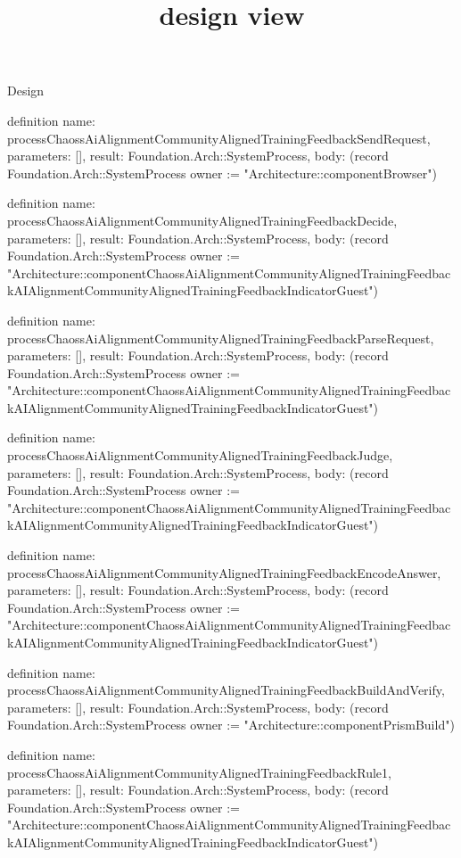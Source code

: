 \begin{lexlean}{Design}
\title{design view}
\begin{semanticmodule}
definition{
  name: processChaossAiAlignmentCommunityAlignedTrainingFeedbackSendRequest,
  parameters: [],
  result: Foundation.Arch::SystemProcess,
  body: (record Foundation.Arch::SystemProcess {owner := "Architecture::componentBrowser"})
}

definition{
  name: processChaossAiAlignmentCommunityAlignedTrainingFeedbackDecide,
  parameters: [],
  result: Foundation.Arch::SystemProcess,
  body: (record Foundation.Arch::SystemProcess {owner := "Architecture::componentChaossAiAlignmentCommunityAlignedTrainingFeedbackAIAlignmentCommunityAlignedTrainingFeedbackIndicatorGuest"})
}

definition{
  name: processChaossAiAlignmentCommunityAlignedTrainingFeedbackParseRequest,
  parameters: [],
  result: Foundation.Arch::SystemProcess,
  body: (record Foundation.Arch::SystemProcess {owner := "Architecture::componentChaossAiAlignmentCommunityAlignedTrainingFeedbackAIAlignmentCommunityAlignedTrainingFeedbackIndicatorGuest"})
}

definition{
  name: processChaossAiAlignmentCommunityAlignedTrainingFeedbackJudge,
  parameters: [],
  result: Foundation.Arch::SystemProcess,
  body: (record Foundation.Arch::SystemProcess {owner := "Architecture::componentChaossAiAlignmentCommunityAlignedTrainingFeedbackAIAlignmentCommunityAlignedTrainingFeedbackIndicatorGuest"})
}

definition{
  name: processChaossAiAlignmentCommunityAlignedTrainingFeedbackEncodeAnswer,
  parameters: [],
  result: Foundation.Arch::SystemProcess,
  body: (record Foundation.Arch::SystemProcess {owner := "Architecture::componentChaossAiAlignmentCommunityAlignedTrainingFeedbackAIAlignmentCommunityAlignedTrainingFeedbackIndicatorGuest"})
}

definition{
  name: processChaossAiAlignmentCommunityAlignedTrainingFeedbackBuildAndVerify,
  parameters: [],
  result: Foundation.Arch::SystemProcess,
  body: (record Foundation.Arch::SystemProcess {owner := "Architecture::componentPrismBuild"})
}

definition{
  name: processChaossAiAlignmentCommunityAlignedTrainingFeedbackRule1,
  parameters: [],
  result: Foundation.Arch::SystemProcess,
  body: (record Foundation.Arch::SystemProcess {owner := "Architecture::componentChaossAiAlignmentCommunityAlignedTrainingFeedbackAIAlignmentCommunityAlignedTrainingFeedbackIndicatorGuest"})
}


\end{semanticmodule}
\end{lexlean}
